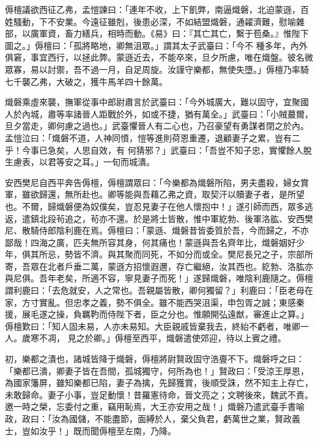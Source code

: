 \begin{pinyinscope}
 傉檀議欲西征乙弗，孟愷諫曰：「連年不收，上下飢弊，南逼熾磐，北迫蒙遜，百姓騷動，下不安業。今遠征雖剋，後患必深，不如結盟熾磐，通糴濟難，慰喻雜部，以廣軍資，畜力繕兵，相時而動。《易》曰：『其亡其亡，繫于苞桑。』惟陛下圖之。」傉檀曰：「孤將略地，卿無沮眾。」謂其太子武臺曰：「今不
 種多年，內外俱窘，事宜西行，以拯此弊。蒙遜近去，不能卒來，旦夕所慮，唯在熾盤。彼名微眾寡，易以討禦，吾不過一月，自足周旋。汝謹守樂都，無使失墮。」傉檀乃率騎七千襲乙弗，大破之，獲牛馬羊四十餘萬。



 熾磐乘虛來襲，撫軍從事中郎尉肅言於武臺曰：「今外城廣大，難以固守，宜聚國人於內城，肅等率諸晉人距戰於外，如或不捷，猶有萬全。」武臺曰：「小賊蕞爾，旦夕當走，卿何慮之過也。」武臺懼晉人有二心也，乃召豪望有勇謀者閉之於內。孟愷泣曰：「熾磐不道，人神同憤，愷等進則荷恩重遷，退顧妻子之累，豈有二乎！今事已急矣，人思自效，有
 何猜邪？」武臺曰：「吾豈不知子忠，實懼餘人脫生慮表，以君等安之耳。」一旬而城潰。



 安西樊尼自西平奔告傉檀，傉檀謂眾曰：「今樂都為熾磐所陷，男夫盡殺，婦女賞軍，雖欲歸還，無所赴也。卿等能與吾藉乙弗之資，取契汗以贖妻子者，是所望也。不爾，歸熾磐便為奴僕矣，豈忍見妻子在他人懷抱中！」遂引師而西，眾多逃返，遣鎮北段茍追之，茍亦不還。於是將士皆散，惟中軍紇勃、後軍洛肱、安西樊尼、散騎侍郎陰利鹿在焉。傉檀曰：「蒙遜、熾磐昔皆委質於吾，今而歸之，不亦鄙哉！四海之廣，匹夫無所容其身，何其痛也！蒙遜與吾名齊年比，熾磐姻好少
 年，俱其所忌，勢皆不濟。與其聚而同死，不如分而或全。樊尼長兄之子，宗部所寄，吾眾在北者戶垂二萬，蒙遜方招懷遐邇，存亡繼絕，汝其西也。紇勃、洛肱亦與尼俱。吾年老矣，所適不容，寧見妻子而死！」遂歸熾磐，唯陰利鹿隨之。傉檀謂利鹿曰：「去危就安，人之常也。吾親屬皆散，卿何獨留？」利鹿曰：「臣老母在家，方寸實亂。但忠孝之義，勢不俱全。雖不能西哭沮渠，申包胥之誠；東感秦援，展毛遂之操，負羈靮而侍陛下者，臣之分也。惟願開弘遠猷，審進止之算。」傉檀歎曰：「知人固未易，人亦未易知。大臣親戚皆棄我去，終紿不虧者，唯卿一人。歲寒不凋，
 見之於卿。」傉檀至西平，熾磐遣使郊迎，待以上賓之禮。



 初，樂都之潰也，諸城皆降于熾磐，傉檀將尉賢政固守浩亹不下。熾磐呼之曰：「樂都已潰，卿妻子皆在吾間，孤城獨守，何所為也！」賢政曰：「受涼王厚恩，為國家籓屏，雖知樂都已陷，妻子為擒，先歸獲賞，後順受誅，然不知主上存亡，未敢歸命。妻子小事，豈足動懷！昔羅憲待命，晉文亮之；文聘後來，魏武不責。邀一時之榮，忘委付之重，竊用恥焉，大王亦安用之哉！」熾磐乃遣武臺手書喻政，政曰：「汝為國儲，不能盡節，面縛於人，棄父負君，虧萬世之業，賢政義士，豈如汝乎！」既而聞傉檀至左南，乃降。




\end{pinyinscope}
